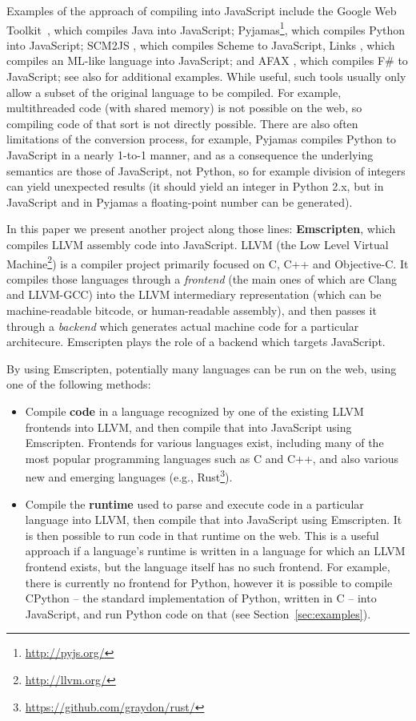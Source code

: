 \documentclass[preprint,10pt]{sigplanconf}
\begin{document}
Examples of the approach of compiling into JavaScript include
the Google Web Toolkit~\cite{gwt}, which compiles Java into JavaScript;
Pyjamas\footnote{\url{http://pyjs.org/}}, which compiles Python into JavaScript;
SCM2JS \cite{hop}, which compiles Scheme to JavaScript,
Links \cite{links}, which compiles an ML-like language into JavaScript;
and AFAX \cite{afax}, which compiles F\# to JavaScript;
see also \cite{ashkenas} for additional examples.
While useful, such tools usually only allow a subset of the original language to
be compiled. For example, multithreaded code (with shared memory) is
not possible on the web, so compiling code of that sort is
not directly possible. There are also often limitations of the conversion
process, for example, Pyjamas compiles Python to JavaScript in a nearly
1-to-1 manner, and as a consequence the underlying semantics are those of JavaScript,
not Python, so for example division of integers can yield unexpected results
(it should yield an integer in Python 2.x,
but in JavaScript and in Pyjamas a floating-point number can be generated).

In this paper we present another project along those lines: \textbf{Emscripten},
which compiles LLVM assembly code into JavaScript. LLVM (the Low Level Virtual
Machine\footnote{\url{http://llvm.org/}}) is a compiler project primarily focused on C, C++ and
Objective-C. It compiles those languages through a \emph{frontend} (the
main ones of which are Clang and LLVM-GCC) into the
LLVM intermediary representation (which can be machine-readable
bitcode, or human-readable assembly), and then passes it
through a \emph{backend} which generates actual machine code for a particular
architecure. Emscripten plays the role of a backend which targets JavaScript.

By using Emscripten, potentially many languages can be
run on the web, using one of the following methods:
\begin{itemize}
\item Compile \textbf{code} in a language recognized by one of the existing LLVM frontends
      into LLVM, and then compile that
      into JavaScript using Emscripten. Frontends for various languages
      exist, including many of the most popular programming languages such as C and
      C++, and also various new and emerging languages (e.g., Rust\footnote{\url{https://github.com/graydon/rust/}}).
\item Compile the \textbf{runtime} used to parse and execute code in
      a particular language into LLVM, then compile that into JavaScript using
      Emscripten. It is then possible to run code in that runtime on the web.
      This is a useful approach if
      a language's runtime is written in a language for which an LLVM
      frontend exists, but the language itself has no such frontend. For
      example, there is currently no frontend for Python, however
      it is possible to compile CPython -- the standard implementation of
      Python, written in C -- into JavaScript, and run Python code on that
      (see Section~\ref{sec:examples}).
\end{itemize}
\end{document}
